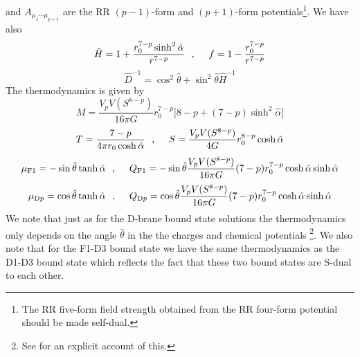 \documentclass[a4paper,twoside,titlepage,12pt]{article}
\begin{document}
and $A_{\mu_1 \cdots \mu_{p+1}}$ are the RR $(p-1)$-form 
and $(p+1)$-form potentials\footnote{The RR five-form field strength
obtained from the RR four-form potential should be made self-dual.}.
We have also
%
\begin{equation}
\hat{H} = 1 + \frac{r_0^{7-p} \sinh^2 \hat{\alpha} }{r^{7-p}} \ \ ,\ \ \ \ 
f = 1 - \frac{r_0^{7-p}}{r^{7-p}}
\end{equation}
%
\begin{equation}
\hat{D}^{-1} = \cos^2 \hat{\theta} + \sin^2 \hat{\theta} \hat{H}^{-1}
\end{equation}
%
The thermodynamics is given by
%
\begin{equation}
\label{NEM}
M = \frac{V_p V(S^{8-p})}{16 \pi G} r_0^{7-p}
\Big[ 8-p + (7-p) \sinh^2 \hat{\alpha} \Big]
\end{equation}
\begin{equation}
\label{NETS}
T = \frac{7-p}{4 \pi r_0 \cosh \hat{\alpha} }
\ \ ,\ \ \ \ 
S =  \frac{V_p V(S^{8-p})}{4 G} r_0^{8-p} \cosh \hat{\alpha} 
\end{equation}
\begin{equation}
\label{NEmQF1}
\mu_{\rm F1} = -\sin \hat{\theta} \tanh \hat{\alpha}
\ \ ,\ \ \ \ 
Q_{\rm F1} 
= -\sin \hat{\theta} \frac{V_p V(S^{8-p})}{16 \pi G} (7-p) r_0^{7-p}
\cosh \hat{\alpha} \sinh \hat{\alpha}
\end{equation}
\begin{equation}
\label{NEmQDp}
\mu_{{\rm D}p} = \cos \hat{\theta} \tanh \hat{\alpha}
\ \ ,\ \ \ \ 
Q_{{\rm D}p} 
= \cos \hat{\theta} \frac{V_p V(S^{8-p})}{16 \pi G} (7-p) r_0^{7-p}
\cosh \hat{\alpha} \sinh \hat{\alpha}
\end{equation}
%
We note that just as for the D-brane bound state solutions 
the thermodynamics only depends on the angle $\hat{\theta}$ 
in the the charges and chemical potentials%
\footnote{See \cite{Harmark:1999rb} for an explicit account of this.}.
We also note that for the F1-D3 bound state we have the same
thermodynamics as the D1-D3 bound state which reflects the fact
that these two bound states are S-dual to each other.
\end{document}
